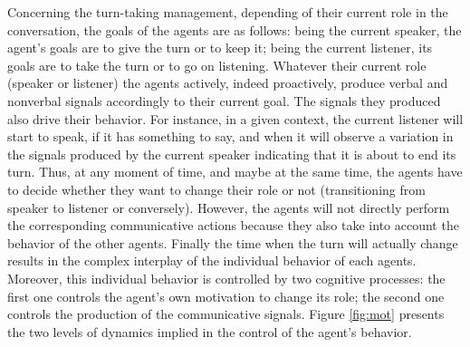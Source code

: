 Concerning the turn-taking management, depending of their current role in the conversation, the goals of the agents are as follows: being the current speaker, the agent's goals are to give the turn or to keep it; being the current listener, its goals are to take the turn or to go on listening. Whatever their current role (speaker or listener) the agents actively, indeed proactively, produce verbal and nonverbal signals accordingly to their current goal. 
The signals they produced also drive their behavior. For instance, in a given context, the current listener will start to speak, if it has something to say, and when it will observe a variation in the signals produced by the current speaker indicating that it is about to end its turn. 
Thus, at any moment of time, and maybe at the same time, the agents have to decide whether they want to change their role or not (transitioning from speaker to listener or conversely). However, the agents will not directly perform the corresponding communicative actions because they also take into account the behavior of the other agents. 
Finally the time when the turn will actually change results in the complex interplay of the individual behavior of each agents. Moreover, this individual behavior is controlled by two cognitive processes: the first one controls the agent's own motivation to change its role; the second one controls the production of the communicative signals. 
Figure \ref{fig:mot} presents the two levels of dynamics implied in the control of the agent's behavior.


